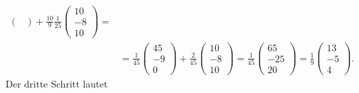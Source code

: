 \documentclass[english, parskip=full]{scrartcl}
\begin{document}
\begin{align}
\begin{pmatrix}
\end{pmatrix} + \frac{10}{9}\frac{1}{25} \begin{pmatrix}
10 \\ -8 \\ 10
\end{pmatrix} = \\
&= \frac{1}{45}\begin{pmatrix}
45 \\ -9 \\ 0
\end{pmatrix} + \frac{2}{45}\begin{pmatrix}
10 \\ -8 \\ 10
\end{pmatrix} = \frac{1}{45}\begin{pmatrix}
65 \\ -25 \\ 20
\end{pmatrix} = \frac{1}{9}\begin{pmatrix}
13 \\ -5 \\ 4
\end{pmatrix}.
\end{align}
Der dritte Schritt lautet
\end{document}
